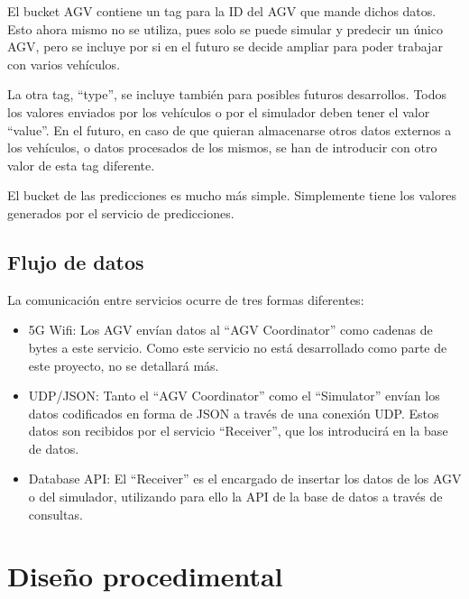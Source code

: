 El bucket AGV contiene un tag para la ID del AGV que mande dichos datos. Esto ahora mismo no se utiliza, pues 
solo se puede simular y predecir un único AGV, pero se incluye por si en el futuro se decide ampliar para poder 
trabajar con varios vehículos. 

La otra tag, ``type'', se incluye también para posibles futuros desarrollos. Todos los valores enviados por los 
vehículos o por el simulador deben tener el valor ``value''. En el futuro, en caso de que quieran almacenarse 
otros datos externos a los vehículos, o datos procesados de los mismos, se han de introducir con otro valor de 
esta tag diferente.


El bucket de las predicciones es mucho más simple. Simplemente tiene los valores generados por el servicio de 
predicciones.

\subsection{Flujo de datos}

La comunicación entre servicios ocurre de tres formas diferentes:
\begin{itemize}
    \item 5G Wifi: Los AGV envían datos al ``AGV Coordinator'' como cadenas de bytes a este servicio.
        Como este servicio no está desarrollado como parte de este proyecto, no se detallará más.
    \item UDP/JSON: Tanto el ``AGV Coordinator'' como el ``Simulator'' envían los datos codificados en 
        forma de JSON a través de una conexión UDP. Estos datos son recibidos por el servicio ``Receiver'',
        que los introducirá en la base de datos.
    \item Database API: El ``Receiver'' es el encargado de insertar los datos de los AGV o del simulador, 
        utilizando para ello la API de la base de datos a través de consultas.
\end{itemize}

\section{Diseño procedimental}

